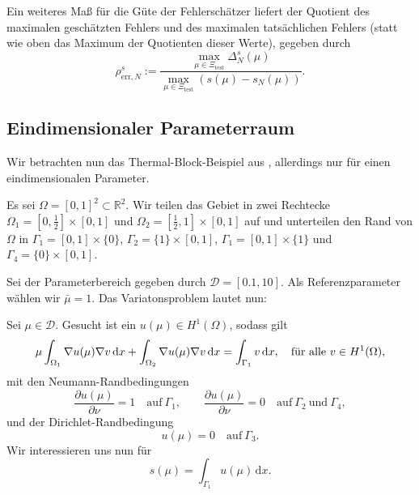 Ein weiteres Maß für die Güte der Fehlerschätzer liefert der Quotient des maximalen geschätzten Fehlers und des maximalen tatsächlichen Fehlers (statt wie oben das Maximum der Quotienten dieser Werte), gegeben durch
\begin{equation}
     \rho^s_{\text{err},N} := \frac{\max\limits_{\mu \in \Xi_\text{test}} \Delta_N^s(\mu)}{\max\limits_{\mu \in \Xi_\text{test}} (s(\mu) - s_N(\mu))}.
\end{equation}


\subsection{Eindimensionaler Parameterraum} %
\label{sub:eindimensionaler_parameterraum}


Wir betrachten nun das Thermal-Block-Beispiel aus \cite{Paro}, allerdings nur für einen eindimensionalen Parameter.

Es sei $\Omega = [ 0, 1 ]^2 \subset \mathbb{R}^2$. Wir teilen das Gebiet in zwei Rechtecke $\Omega_1 = [0, \frac{1}{2}] \times [ 0, 1 ] $ und $\Omega_2 = [ \frac{1}{2}, 1 ] \times [ 0, 1 ]$ auf und unterteilen den Rand von $\Omega$ in $\Gamma_1 = [0, 1] \times \{ 0 \}$, $\Gamma_2 = \{ 1 \} \times [0, 1]$, $\Gamma_1 = [0, 1] \times \{ 1 \}$ und $\Gamma_4 = \{ 0 \} \times [0, 1]$.

Sei der Parameterbereich gegeben durch $\mathcal D = [0.1, 10]$. Als Referenzparameter wählen wir $\bar \mu = 1$.
Das Variatonsproblem lautet nun:
\begin{addmargin}[2em]{2em}
Sei $\mu \in \mathcal D$. Gesucht ist ein $u(\mu) \in H^1(\Omega)$, sodass gilt
\begin{equation}
    \mu \int_{\Omega_1} \nabla u(\mu) \nabla v \, \mathrm d x + \int_{\Omega_2} \nabla u(\mu) \nabla v \, \mathrm d x = \int_{\Gamma_1} v \, \mathrm{d} x, \quad \fa v \in H^1(\Omega),
\end{equation}
mit den Neumann-Randbedingungen
\begin{equation}
    \frac{\partial u(\mu)}{\partial \nu} = 1
    \quad \text{auf}~ \Gamma_1,
    \qquad
    \frac{\partial u(\mu)}{\partial \nu} = 0
    \quad \text{auf} ~ \Gamma_2 ~\text{und}~ \Gamma_4,
\end{equation}
und der Dirichlet-Randbedingung
\begin{equation}
    u(\mu) = 0 \quad \text{auf} ~\Gamma_3.
\end{equation}
Wir interessieren uns nun für
\begin{equation}
    s(\mu) = \int_{\Gamma_1} u(\mu) \, \mathrm{d}x.
\end{equation}
\end{addmargin}


